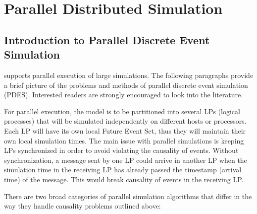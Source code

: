 \chapter{Parallel Distributed Simulation}
\label{cha:parallel-execution}


\section{Introduction to Parallel Discrete Event Simulation}

{\opp} supports parallel execution of large
simulations. The following paragraphs provide a brief picture
of the problems and methods of parallel
discrete event simulation (PDES). Interested readers are
strongly encouraged to look into the literature.

For parallel execution, the model is to be partitioned into several
LPs (logical processes) that will be simulated independently on
different hosts or processors. Each LP will have its own local
Future Event Set, thus they will maintain their own local simulation
times. The main issue with parallel simulations is keeping LPs
synchronized in order to avoid violating the causality of events.
Without synchronization, a message sent by one LP could arrive in
another LP when the simulation time in the receiving LP has already
passed the timestamp (arrival time) of the message. This would break
causality of events in the receiving LP.

There are two broad categories of parallel simulation algorithms
that differ in the way they handle causality problems outlined
above:

